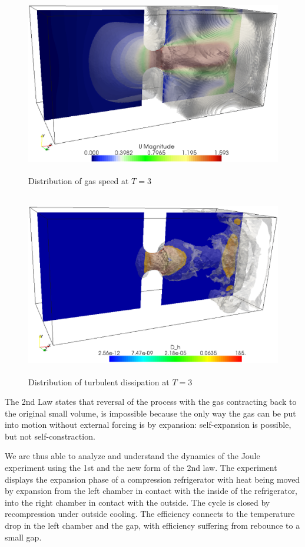 \begin{figure}[bhpt]
\centerline{
\includegraphics[height=8.0cm]
{chapters/hoffman-3/eps/vel_T_3.eps}
}
\caption{Distribution of gas speed at $T=3$}
\label{vel3}
\end{figure}

\begin{figure}[bhpt]
\centerline{
\includegraphics[height=8.0cm]
{chapters/hoffman-3/eps/tur_disp.eps}
}
\caption{Distribution of turbulent dissipation at $T=3$}
\label{tur_disp_dist}
\end{figure}


The 2nd Law states that reversal of
the process with the gas contracting back to the original small volume,
is impossible because the only way the gas can be put into motion without
external forcing is
by expansion: self-expansion is possible, but not self-constraction.

We are thus able to analyze and understand the dynamics of the Joule experiment
using the 1st and
the new form of the 2nd law. The experiment displays the expansion phase of a
compression refrigerator
with heat being moved by expansion from the left chamber in contact with the
inside of the refrigerator,
into the right chamber in contact with the outside. The cycle is closed by
recompression under outside cooling.
The efficiency connects to the temperature drop in the left chamber and the gap,
with efficiency suffering from
rebounce to a small gap.

